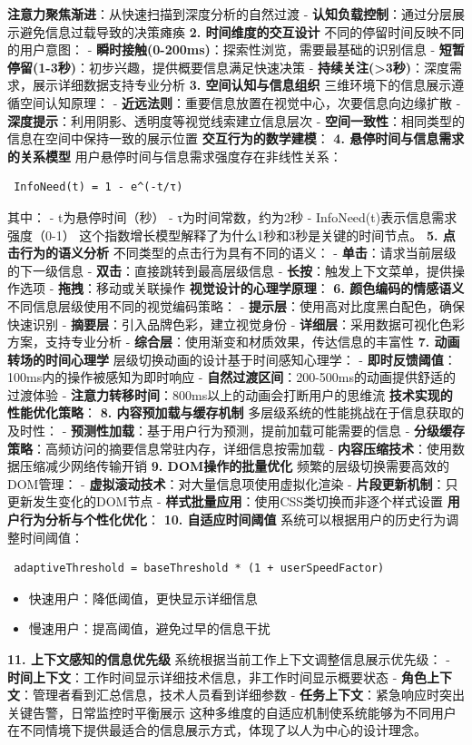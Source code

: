 {{{{\textbf{注意力聚焦渐进}：从快速扫描到深度分析的自然过渡 - \textbf{认知负载控制}：通过分层展示避免信息过载导致的决策瘫痪 \textbf{2. 时间维度的交互设计} 不同的停留时间反映不同的用户意图： - \textbf{瞬时接触(0-200ms)}：探索性浏览，需要最基础的识别信息 - \textbf{短暂停留(1-3秒)}：初步兴趣，提供概要信息满足快速决策 - \textbf{持续关注(\textgreater3秒)}：深度需求，展示详细数据支持专业分析 \textbf{3. 空间认知与信息组织} 三维环境下的信息展示遵循空间认知原理： - \textbf{近远法则}：重要信息放置在视觉中心，次要信息向边缘扩散 - \textbf{深度提示}：利用阴影、透明度等视觉线索建立信息层次 - \textbf{空间一致性}：相同类型的信息在空间中保持一致的展示位置 \textbf{交互行为的数学建模}： \textbf{4. 悬停时间与信息需求的关系模型} 用户悬停时间与信息需求强度存在非线性关系： \begin{verbatim} InfoNeed(t) = 1 - e^(-t/τ) \end{verbatim} 其中： - t为悬停时间（秒） - τ为时间常数，约为2秒 - InfoNeed(t)表示信息需求强度（0-1） 这个指数增长模型解释了为什么1秒和3秒是关键的时间节点。 \textbf{5. 点击行为的语义分析} 不同类型的点击行为具有不同的语义： - \textbf{单击}：请求当前层级的下一级信息 - \textbf{双击}：直接跳转到最高层级信息 - \textbf{长按}：触发上下文菜单，提供操作选项 - \textbf{拖拽}：移动或关联操作 \textbf{视觉设计的心理学原理}： \textbf{6. 颜色编码的情感语义} 不同信息层级使用不同的视觉编码策略： - \textbf{提示层}：使用高对比度黑白配色，确保快速识别 - \textbf{摘要层}：引入品牌色彩，建立视觉身份 - \textbf{详细层}：采用数据可视化色彩方案，支持专业分析 - \textbf{综合层}：使用渐变和材质效果，传达信息的丰富性 \textbf{7. 动画转场的时间心理学} 层级切换动画的设计基于时间感知心理学： - \textbf{即时反馈阈值}：100ms内的操作被感知为即时响应 - \textbf{自然过渡区间}：200-500ms的动画提供舒适的过渡体验 - \textbf{注意力转移时间}：800ms以上的动画会打断用户的思维流 \textbf{技术实现的性能优化策略}： \textbf{8. 内容预加载与缓存机制} 多层级系统的性能挑战在于信息获取的及时性： - \textbf{预测性加载}：基于用户行为预测，提前加载可能需要的信息 - \textbf{分级缓存策略}：高频访问的摘要信息常驻内存，详细信息按需加载 - \textbf{内容压缩技术}：使用数据压缩减少网络传输开销 \textbf{9. DOM操作的批量优化} 频繁的层级切换需要高效的DOM管理： - \textbf{虚拟滚动技术}：对大量信息项使用虚拟化渲染 - \textbf{片段更新机制}：只更新发生变化的DOM节点 - \textbf{样式批量应用}：使用CSS类切换而非逐个样式设置 \textbf{用户行为分析与个性化优化}： \textbf{10. 自适应时间阈值} 系统可以根据用户的历史行为调整时间阈值： \begin{verbatim} adaptiveThreshold = baseThreshold * (1 + userSpeedFactor) \end{verbatim} \begin{itemize} \item 快速用户：降低阈值，更快显示详细信息 \item 慢速用户：提高阈值，避免过早的信息干扰 \end{itemize} \textbf{11. 上下文感知的信息优先级} 系统根据当前工作上下文调整信息展示优先级： - \textbf{时间上下文}：工作时间显示详细技术信息，非工作时间显示概要状态 - \textbf{角色上下文}：管理者看到汇总信息，技术人员看到详细参数 - \textbf{任务上下文}：紧急响应时突出关键告警，日常监控时平衡展示 这种多维度的自适应机制使系统能够为不同用户在不同情境下提供最适合的信息展示方式，体现了以人为中心的设计理念。 }}}}

